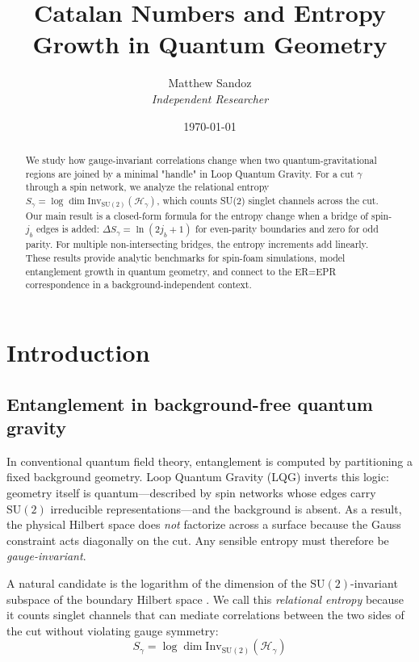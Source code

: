 \documentclass[11pt, a4paper]{article}
\title{Catalan Numbers and Entropy Growth in Quantum Geometry}
\author{Matthew Sandoz\\ \textit{Independent Researcher}}
\date{\today}
\theoremstyle{plain}
\theoremstyle{definition}
\theoremstyle{remark}
\newcommand{\Hil}{\mathcal{H}}
\newcommand{\Inv}{\mathrm{Inv}}
\newcommand{\SU}{\mathrm{SU}}
\begin{document}
\begin{abstract}
  We study how gauge-invariant correlations change when two quantum-gravitational regions are joined by a minimal "handle" in Loop Quantum Gravity. For a cut $\gamma$ through a spin network, we analyze the relational entropy $S_{\gamma} = \log\dim\Inv_{\SU(2)}(\Hil_{\gamma})$, which counts SU(2) singlet channels across the cut. Our main result is a closed-form formula for the entropy change when a bridge of spin-$j_b$ edges is added: $\Delta S_{\gamma} = \ln(2j_b+1)$ for even-parity boundaries and zero for odd parity. For multiple non-intersecting bridges, the entropy increments add linearly. These results provide analytic benchmarks for spin-foam simulations, model entanglement growth in quantum geometry, and connect to the ER=EPR correspondence in a background-independent context.
\end{abstract}

\maketitle

\section{Introduction}
\label{sec:intro}

\subsection{Entanglement in background-free quantum gravity}

In conventional quantum field theory, entanglement is computed by partitioning a fixed background geometry. Loop Quantum Gravity (LQG) inverts this logic: geometry itself is quantum—described by spin networks whose edges carry $\SU(2)$ irreducible representations—and the background is absent. As a result, the physical Hilbert space does \emph{not} factorize across a surface because the Gauss constraint acts diagonally on the cut. Any sensible entropy must therefore be \emph{gauge-invariant}.

A natural candidate is the logarithm of the dimension of the $\SU(2)$-invariant subspace of the boundary Hilbert space \cite{DonnellyFreidel2016,DonnellyWall2016}. We call this \emph{relational entropy} because it counts singlet channels that can mediate correlations between the two sides of the cut without violating gauge symmetry:
\begin{equation}
  S_{\gamma} = \log\dim\Inv_{\SU(2)}(\Hil_{\gamma})
\end{equation}
\end{document}
